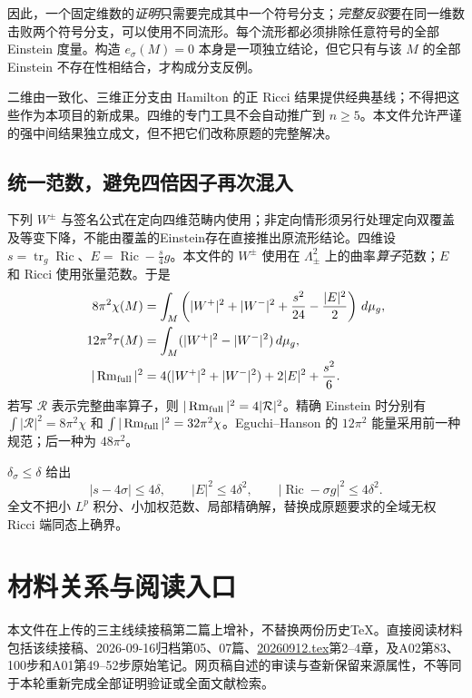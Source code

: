 \documentclass[UTF8,a4paper,11pt,fontset=fandol]{ctexart}
\numberwithin{equation}{section}
\theoremstyle{definition}
\newcommand{\Ric}{\operatorname{Ric}}
\newcommand{\Rm}{\operatorname{Rm}}
\newcommand{\tr}{\operatorname{tr}}
\newcommand{\dd}{\,d\mu_g}
\begin{document}
因此，一个固定维数的\emph{证明}只需要完成其中一个符号分支；\emph{完整反驳}要在同一维数击败两个符号分支，可以使用不同流形。每个流形都必须排除任意符号的全部 Einstein 度量。构造 $e_\sigma(M)=0$ 本身是一项独立结论，但它只有与该 $M$ 的全部 Einstein 不存在性相结合，才构成分支反例。

二维由一致化、三维正分支由 Hamilton 的正 Ricci 结果提供经典基线；不得把这些作为本项目的新成果。四维的专门工具不会自动推广到 $n\ge5$。本文件允许严谨的强中间结果独立成文，但不把它们改称原题的完整解决。

\subsection{统一范数，避免四倍因子再次混入}
下列 $W^\pm$ 与签名公式在定向四维范畴内使用；非定向情形须另行处理定向双覆盖及等变下降，不能由覆盖的Einstein存在直接推出原流形结论。四维设 $s=\tr_g\Ric$、$E=\Ric-\frac{s}{4}g$。本文件的 $W^\pm$ 使用在 $\Lambda^2_\pm$ 上的曲率\emph{算子}范数；$E$ 和 Ricci 使用张量范数。于是
\begin{align}
8\pi^2\chi(M)&=\int_M\left(|W^+|^2+|W^-|^2+\frac{s^2}{24}-\frac{|E|^2}{2}\right)\dd,\label{eq:CGB}\\
12\pi^2\tau(M)&=\int_M(|W^+|^2-|W^-|^2)\dd,\label{eq:signature}\\
|\Rm_{\rm full}|^2&=4(|W^+|^2+|W^-|^2)+2|E|^2+\frac{s^2}{6}.
\end{align}
若写 $\mathcal R$ 表示完整曲率算子，则 $|\Rm_{\rm full}|^2=4|\mathcal R|^2$。精确 Einstein 时分别有 $\int|\mathcal R|^2=8\pi^2\chi$ 和 $\int|\Rm_{\rm full}|^2=32\pi^2\chi$。Eguchi--Hanson 的 $12\pi^2$ 能量采用前一种规范；后一种为 $48\pi^2$。

$\delta_\sigma\le\delta$ 给出
\begin{equation}
 |s-4\sigma|\le4\delta,\qquad |E|^2\le4\delta^2,\qquad
 |\Ric-\sigma g|^2\le4\delta^2.
\end{equation}
全文不把小 $L^p$ 积分、小加权范数、局部精确解，替换成原题要求的全域无权 Ricci 端同态上确界。

\section{材料关系与阅读入口}
本文件在上传的三主线续接稿第二篇上增补，不替换两份历史TeX。直接阅读材料包括该续接稿、2026-09-16归档第05、07篇、\href{20260912.tex}{20260912.tex}第2--4章，及A02第83、100步和A01第49--52步原始笔记。网页稿自述的审读与查新保留来源属性，不等同于本轮重新完成全部证明验证或全面文献检索。
\end{document}
